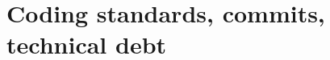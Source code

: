 \chapter{\texorpdfstring{Coding standards, commits, technical debt}{Coding standards, commits, technical debt}}\label{developer_manual-06u5fstandards}
